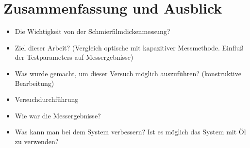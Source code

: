 \chapter{Zusammenfassung und Ausblick}
\label{zusammenfassung_und_ausblick}

\begin{itemize}
    \item Die Wichtigkeit von der Schmierfilmdickenmessung?
    \item Ziel dieser Arbeit? (Vergleich optische mit kapazitiver Messmethode. Einfluß der Testparameters auf Messergebnisse)
    \item Was wurde gemacht, um dieser Versuch möglich auszuführen? (konstruktive Bearbeitung)
    \item Versuchdurchführung
    \item Wie war die Messergebnisse?
    \item Was kann man bei dem System verbessern? Ist es möglich das System mit Öl zu verwenden?
\end{itemize}


